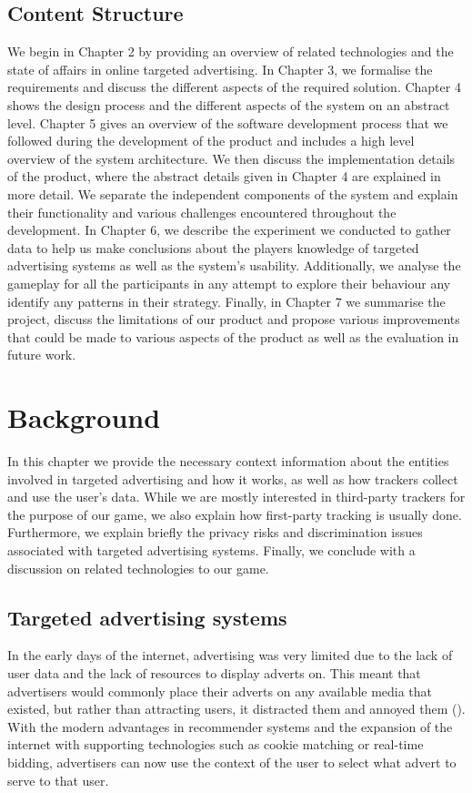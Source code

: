 \documentclass{l4proj}
\begin{document}
\section{Content Structure}
We begin in Chapter 2 by providing an overview of related technologies and the state of affairs in online targeted advertising. In Chapter 3, we formalise the requirements and discuss the different aspects of the required solution. Chapter 4 shows the design process and the different aspects of the system on an abstract level. Chapter 5 gives an overview of the software development process that we followed during the development of the product and includes a high level overview of the system architecture. We then discuss the implementation details of the product, where the abstract details given in Chapter 4 are explained in more detail. We separate the independent components of the system and explain their functionality and various challenges encountered throughout the development. In Chapter 6, we describe the experiment we conducted to gather data to help us make conclusions about the players knowledge of targeted advertising systems as well as the system's usability. Additionally, we analyse the gameplay for all the participants in any attempt to explore their behaviour any identify any patterns in their strategy. Finally, in Chapter 7 we summarise the project, discuss the limitations of our product and propose various improvements that could be made to various aspects of the product as well as the evaluation in future work.

\chapter{Background}
In this chapter we provide the necessary context information about the entities involved in targeted advertising and how it works, as well as how trackers collect and use the user's data. While we are mostly interested in third-party trackers for the purpose of our game, we also explain how first-party tracking is usually done. Furthermore, we explain briefly the privacy risks and discrimination issues associated with targeted advertising systems. Finally, we conclude with a discussion on related technologies to our game.

\section{Targeted advertising systems}
\label{targeted}
In the early days of the internet, advertising was very limited due to the lack of user data and the lack of resources to display adverts on. This meant that advertisers would commonly place their adverts on any available media that existed, but rather than attracting users, it distracted them and annoyed them (\cite{earlyads}). With the modern advantages in recommender systems and the expansion of the internet with supporting technologies such as cookie matching or real-time bidding, advertisers can now use the context of the user to select what advert to serve to that user.    
\end{document}
